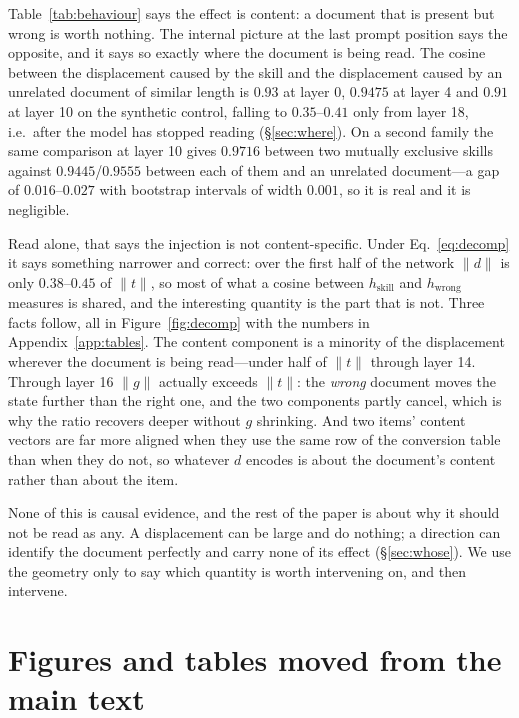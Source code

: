 \documentclass{article}
\newcommand{\dvec}{\ensuremath{d}}
\newcommand{\gvec}{\ensuremath{g}}
\newcommand{\tvec}{\ensuremath{t}}
\begin{document}
Table~\ref{tab:behaviour} says the effect is content: a document that is present
but wrong is worth nothing. The internal picture at the last prompt position says
the opposite, and it says so exactly where the document is being read. The cosine
between the displacement caused by the skill and the displacement caused by an
unrelated document of similar length is $0.93$ at layer 0, $0.9475$ at layer 4
and $0.91$ at layer 10 on the synthetic control, falling to $0.35$--$0.41$ only
from layer 18, i.e.\ after the model has stopped reading (\S\ref{sec:where}). On
a second family the same comparison at layer 10 gives $0.9716$ between two
mutually exclusive skills against $0.9445$/$0.9555$ between each of them and an
unrelated document---a gap of $0.016$--$0.027$ with bootstrap intervals of width
$0.001$, so it is real and it is negligible.

Read alone, that says the injection is not content-specific. Under
Eq.~\ref{eq:decomp} it says something narrower and correct: over the first half
of the network $\|\dvec\|$ is only $0.38$--$0.45$ of $\|\tvec\|$, so most of what
a cosine between $h_{\text{skill}}$ and $h_{\text{wrong}}$ measures is shared,
and the interesting quantity is the part that is not. Three facts follow, all in
Figure~\ref{fig:decomp} with the numbers in Appendix~\ref{app:tables}. The
content component is a minority of the displacement wherever the document is
being read---under half of $\|\tvec\|$ through layer 14. Through layer 16
$\|\gvec\|$ actually exceeds $\|\tvec\|$: the \emph{wrong} document moves the
state further than the right one, and the two components partly cancel, which is
why the ratio recovers deeper without $\gvec$ shrinking. And two items' content
vectors are far more aligned when they use the same row of the conversion table
than when they do not, so whatever $\dvec$ encodes is about the document's
content rather than about the item.



None of this is causal evidence, and the rest of the paper is about why it
should not be read as any. A displacement can be large and do nothing; a
direction can identify the document perfectly and carry none of its effect
(\S\ref{sec:whose}). We use the geometry only to say which quantity is worth
intervening on, and then intervene.


\clearpage

\section{Figures and tables moved from the main text}
\label{app:moved}
\end{document}
